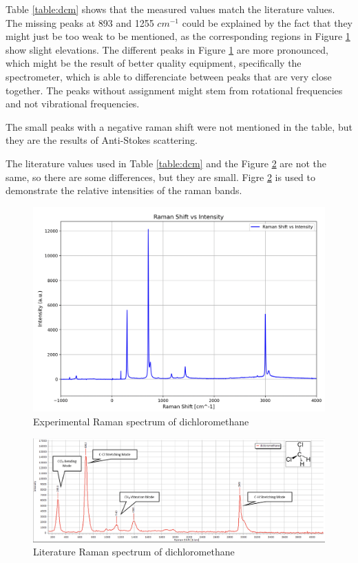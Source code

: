     Table \ref{table:dcm} shows that the measured values match the literature values. The missing peaks at 893 and 1255 \( cm^{-1}\) could be explained by the fact that they might just be too weak to be mentioned, as the corresponding regions in Figure \ref{fig:dcm_x} show slight elevations. The different peaks in Figure \ref{fig:dcm_x} are more pronounced, which might be the result of better quality equipment, specifically the spectrometer, which is able to differenciate between peaks that are very close together. The peaks without assignment might stem from rotational frequencies and not vibrational frequencies.


    \bigskip

    The small peaks with a negative raman shift were not mentioned in the table, but they are the results of Anti-Stokes scattering.

    \bigskip

    The literature values used in Table \ref{table:dcm} and the Figure \ref{fig:dcm_l} are not the same, so there are some differences, but they are small. Figre \ref{fig:dcm_l} is used to demonstrate the relative intensities of the raman bands.


     
    \begin{figure}[h]
        \centering
        \includegraphics[width=\textwidth]{images/raman_spectra/raman_shift_DCM.png}
        \caption{Experimental Raman spectrum of dichloromethane}
        \label{fig:dcm_x}
    \end{figure}

    \begin{figure}[h]
        \includegraphics[width=\textwidth]{images/lit_raman/dichloromethane.png}
        \caption{Literature Raman spectrum of dichloromethane \cite{spectrumdcm}}
        \label{fig:dcm_l}
    \end{figure}

